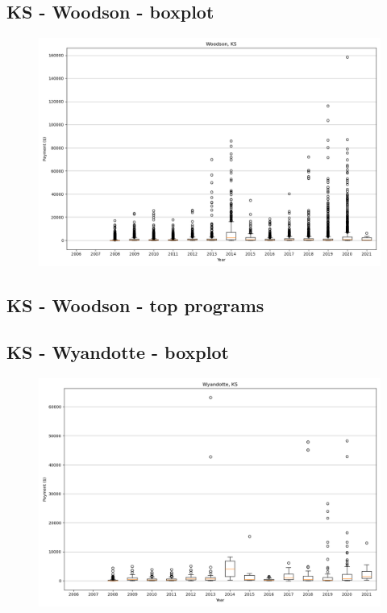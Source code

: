 \subsection*{KS - Woodson - boxplot}
\begin{figure}[h]
\centering
\includegraphics[width=7in]{../output/boxplots/counties/Woodson-KS_boxplot.png}
\end{figure}


\subsection*{KS - Woodson - top programs}

\newpage
\subsection*{KS - Wyandotte - boxplot}
\begin{figure}[h]
\centering
\includegraphics[width=7in]{../output/boxplots/counties/Wyandotte-KS_boxplot.png}
\end{figure}


